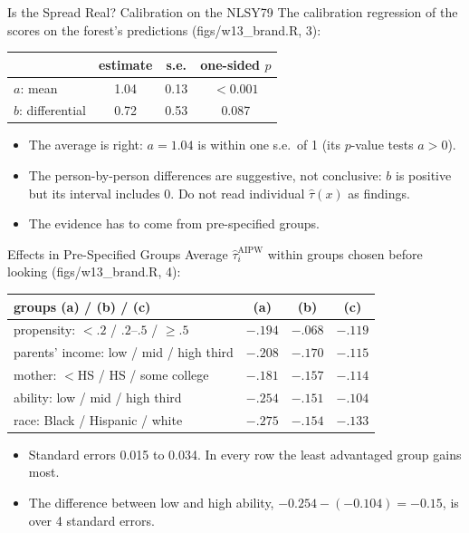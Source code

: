 \documentclass[aspectratio=169,11pt,xcolor=dvipsnames]{beamer}
\newcommand{\srcp}[1]{{\scriptsize\color{gray}(#1)}}
\begin{document}
\begin{frame}{Is the Spread Real? Calibration on the NLSY79}
The calibration regression of the scores on the forest's predictions \srcp{figs/w13\_brand.R, 3}:
\begin{center}\small
\renewcommand{\arraystretch}{1.12}
\begin{tabular}{@{}lccc@{}}
\toprule
& estimate & s.e. & one-sided $p$ \\
\midrule
$a$: mean & 1.04 & 0.13 & $<0.001$ \\
$b$: differential & 0.72 & 0.53 & 0.087 \\
\bottomrule
\end{tabular}
\end{center}
\vskip4pt
\begin{itemize}\itemsep4pt
  \item The average is right: $a = 1.04$ is within one s.e.\ of 1 (its $p$-value tests $a > 0$).
  \item The person-by-person differences are suggestive, not conclusive: $b$ is positive but
        its interval includes 0. Do not read individual $\hat\tau(x)$ as findings.
  \item The evidence has to come from pre-specified groups.
\end{itemize}
\end{frame}

\begin{frame}{Effects in Pre-Specified Groups}
Average $\hat\tau_i^{\text{AIPW}}$ within groups chosen before looking \srcp{figs/w13\_brand.R, 4}:
\begin{center}\small
\renewcommand{\arraystretch}{1.12}
\begin{tabular}{@{}lccc@{}}
\toprule
groups (a) / (b) / (c) & (a) & (b) & (c) \\
\midrule
propensity: $<.2$ / $.2$--$.5$ / $\geq .5$ & $-.194$ & $-.068$ & $-.119$ \\
parents' income: low / mid / high third & $-.208$ & $-.170$ & $-.115$ \\
mother: $<$HS / HS / some college & $-.181$ & $-.157$ & $-.114$ \\
ability: low / mid / high third & $-.254$ & $-.151$ & $-.104$ \\
race: Black / Hispanic / white & $-.275$ & $-.154$ & $-.133$ \\
\bottomrule
\end{tabular}
\end{center}
\vskip2pt
\begin{itemize}\itemsep2pt\small
  \item Standard errors 0.015 to 0.034. In every row the least advantaged group gains most.
  \item The difference between low and high ability, $-0.254 - (-0.104) = -0.15$, is
        over 4 standard errors.
\end{itemize}
\end{frame}
\end{document}
